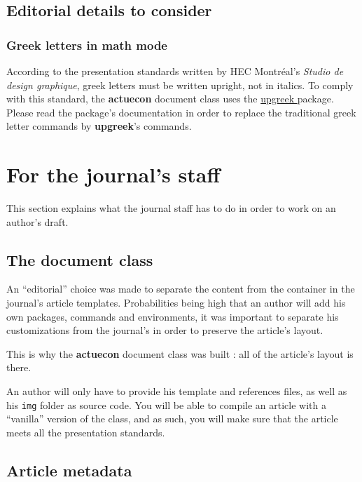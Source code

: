 \documentclass[english]{article}
\newcommand{\lien}[2]{%
	\href{#1}{#2 \faIcon{external-link-alt}}
}
\begin{document}
		\subsection{Editorial details to consider}
		
			\subsubsection{Greek letters in math mode}
			
			According to the presentation standards written by HEC Montréal's 
			\emph{Studio de design graphique}, greek letters must be written upright, not in italics. To comply
			with this standard, the \textbf{actuecon} document class uses the
			\lien{http://mirrors.ctan.org/macros/latex/contrib/was/upgreek.pdf}{upgreek} package. Please read
			the package's documentation in order to replace the traditional greek letter commands by \textbf{upgreek}'s
			commands.
	
	\section{For the journal's staff}
		\label{sec:personnel}
		
		This section explains what the journal staff has to do in order to work on an author's draft.
		
		\subsection{The document class}
		
			An ``editorial'' choice was made to separate the content from the container in the journal's
			article templates. Probabilities being high that an author will add his own packages, commands
			and environments, it was important to separate his customizations from the journal's in order
			to preserve the article's layout.
			
			This is why the \textbf{actuecon} document class was built : all of the article's layout is there.
			
			An author will only have to provide his template and references files, as well as his \texttt{img} folder
			as source code. You will be able to compile an article with a ``vanilla'' version of the class, and as such,
			you will make sure that the article meets all the presentation standards.
			
		\subsection{Article metadata}
		
\end{document}
